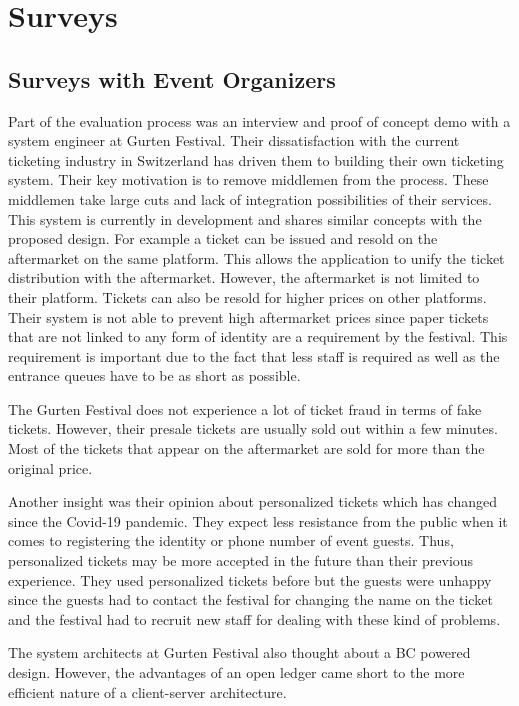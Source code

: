 \section{Surveys}

\subsection{Surveys with Event Organizers}

Part of the evaluation process was an interview and proof of concept demo with a system engineer at Gurten Festival. Their dissatisfaction with the current ticketing industry in Switzerland has driven them to building their own ticketing system. Their key motivation is to remove middlemen from the process. These middlemen take large cuts and lack of integration possibilities of their services. This system is currently in development and shares similar concepts with the proposed design. For example a ticket can be issued and resold on the aftermarket on the same platform. This allows the application to unify the ticket distribution with the aftermarket. However, the aftermarket is not limited to their platform. Tickets can also be resold for higher prices on other platforms. Their system is not able to prevent high aftermarket prices since paper tickets that are not linked to any form of identity are a requirement by the festival. This requirement is important due to the fact that less staff is required as well as the entrance queues have to be as short as possible. 

The Gurten Festival does not experience a lot of ticket fraud in terms of fake tickets. However, their presale tickets are usually sold out within a few minutes. Most of the tickets that appear on the aftermarket are sold for more than the original price.

Another insight was their opinion about personalized tickets which has changed since the Covid-19 pandemic. They expect less resistance from the public when it comes to registering the identity or phone number of event guests. Thus, personalized tickets may be more accepted in the future than their previous experience. They used personalized tickets before but the guests were unhappy since the guests had to contact the festival for changing the name on the ticket and the festival had to recruit new staff for dealing with these kind of problems. 

The system architects at Gurten Festival also thought about a BC powered design. However, the advantages of an open ledger came short to the more efficient nature of a client-server architecture.

